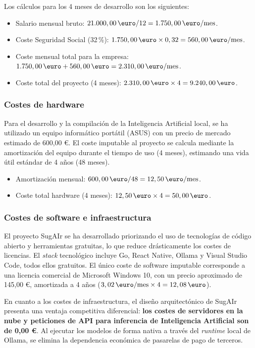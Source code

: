 Los cálculos para los 4 meses de desarrollo son los siguientes:
\begin{itemize}
    \item Salario mensual bruto: $21.000,00\,\text{\euro} / 12 = 1.750,00\,\text{\euro/mes}$.
    \item Coste Seguridad Social (32\,\%): $1.750,00\,\text{\euro} \times 0,32 = 560,00\,\text{\euro/mes}$.
    \item Coste mensual total para la empresa: $1.750,00\,\text{\euro} + 560,00\,\text{\euro} = 2.310,00\,\text{\euro/mes}$.
    \item Coste total del proyecto (4 meses): $2.310,00\,\text{\euro} \times 4 = 9.240,00\,\text{\euro}$.
\end{itemize}

\subsubsection*{Costes de hardware}
Para el desarrollo y la compilación de la Inteligencia Artificial local, se ha utilizado un equipo informático portátil (ASUS) con un precio de mercado estimado de 600,00 \euro. El coste imputable al proyecto se calcula mediante la amortización del equipo durante el tiempo de uso (4 meses), estimando una vida útil estándar de 4 años (48 meses).

\begin{itemize}
    \item Amortización mensual: $600,00\,\text{\euro} / 48 = 12,50\,\text{\euro/mes}$.
    \item Coste total hardware (4 meses): $12,50\,\text{\euro} \times 4 = 50,00\,\text{\euro}$.
\end{itemize}

\subsubsection*{Costes de software e infraestructura}
El proyecto SugAIr se ha desarrollado priorizando el uso de tecnologías de código abierto y herramientas gratuitas, lo que reduce drásticamente los costes de licencias. El \textit{stack} tecnológico incluye Go, React Native, Ollama y Visual Studio Code, todos ellos gratuitos. El único coste de software imputable corresponde a una licencia comercial de Microsoft Windows 10, con un precio aproximado de 145,00 \euro, amortizada a 4 años ($3,02\,\text{\euro/mes} \times 4 = 12,08\,\text{\euro}$).

En cuanto a los costes de infraestructura, el diseño arquitectónico de SugAIr presenta una ventaja competitiva diferencial: \textbf{los costes de servidores en la nube y peticiones de API para inferencia de Inteligencia Artificial son de 0,00 \euro}. Al ejecutar los modelos de forma nativa a través del \textit{runtime} local de Ollama, se elimina la dependencia económica de pasarelas de pago de terceros.

